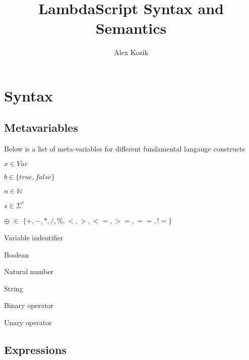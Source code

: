 \documentclass[titlepage]{article}
\title{LambdaScript Syntax and Semantics}
\author{Alex Kozik}
\begin{document}
\large
\newcommand{\desc}[1]{\textit{\textcolor{Aquamarine}{#1}}}



\maketitle
\tableofcontents
\newpage

\section{Syntax}

\subsection{Metavariables}

Below is a list of meta-variables for different fundamental langauge constructs

\begin{minipage}[t]{0.4\textwidth}



$x \in  Var$

$b \in \{true, false\}$

$n \in \mathbb{N}$

$s \in \Sigma ^ *$

$\oplus$ $\in$ $\{+, -, *, /, \%, <, >, <=, >=, ==, !=\}$


\end{minipage}
\begin{minipage}[t]{0.6\textwidth}
Variable indentifier

Boolean

Natural number

String

Binary operator

Unary operator

\end{minipage}
\subsection{Expressions}
\end{document}
